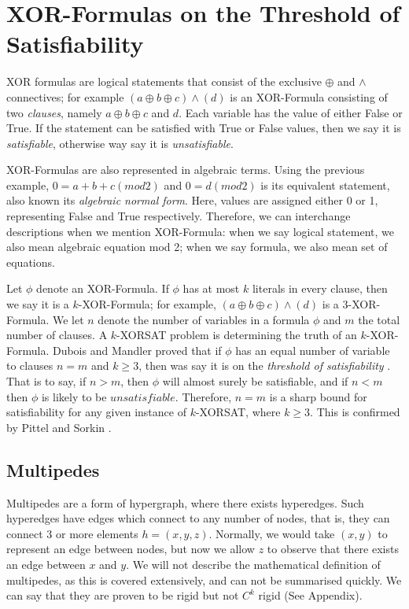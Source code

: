 \section{XOR-Formulas on the Threshold of Satisfiability}
XOR formulas are logical statements that consist of the exclusive $\oplus$ and $\land$ connectives; for example $(a\oplus b \oplus c) \land (d)$ is an XOR-Formula consisting of two \emph{clauses}, namely $a\oplus b \oplus c$ and $d$. Each variable has the value of either False or True. If the statement can be satisfied with True or False values, then we say it is  \emph{satisfiable}, otherwise way say it is \emph{unsatisfiable}.
\par
XOR-Formulas are also represented in algebraic terms. Using the previous example, $0=a+b+c (mod 2)$ and $0=d (mod 2)$ is its equivalent statement, also known its \emph{algebraic normal form}. Here, values are assigned either 0 or 1, representing False and True respectively. Therefore, we can interchange descriptions when we mention XOR-Formula: when we say logical statement, we also mean algebraic equation mod 2; when we say formula, we also mean set of equations.
\par
Let $\phi$ denote an XOR-Formula. If $\phi$ has at most $k$ literals in every clause, then we say it is a $k$-XOR-Formula; for example, $(a\oplus b \oplus c) \land (d)$ is a 3-XOR-Formula. We let $n$ denote the number of variables in a formula $\phi$ and $m$ the total number of clauses. A $k$-XORSAT problem is determining the truth of an $k$-XOR-Formula. Dubois and Mandler proved that if $\phi$ has an equal number of variable to clauses $n=m$ and $k\geq3$, then was say it is on the \emph{threshold of satisfiability} \cite{dubois20023}. That is to say, if $n>m$, then $\phi$ will almost surely be satisfiable, and if $n<m$ then $\phi$ is likely to be $unsatisfiable$. Therefore, $n=m$ is a sharp bound for satisfiability for any given instance of $k$-XORSAT, where $k\geq3$. This is confirmed by Pittel and Sorkin \cite{pittel2016satisfiability}.

\subsection{Multipedes}
Multipedes are a form of hypergraph, where there exists hyperedges. Such hyperedges have edges which connect to any number of nodes, that is, they can connect 3 or more elements $h=(x,y,z)$. Normally, we would take $(x,y)$ to represent an edge between nodes, but now we allow $z$ to observe that there exists an edge between $x$ and $y$. We will not describe the mathematical definition of multipedes, as this is covered extensively, and can not be summarised quickly. We can say that they are proven to be rigid but not $C^{k}$ rigid (See Appendix).

